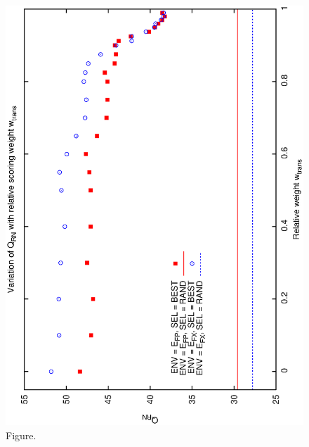 \documentclass[12pt,a4paper]{article}
\begin{document}
\begin{figure}[htbp]
 \begin{center}
  \includegraphics[scale=1.0, angle=0]{figures/cs1_dw1a2_rn.eps}
 \end{center}
  \caption[Figure.]
{Figure.}
\end{figure}
\clearpage
\end{document}
